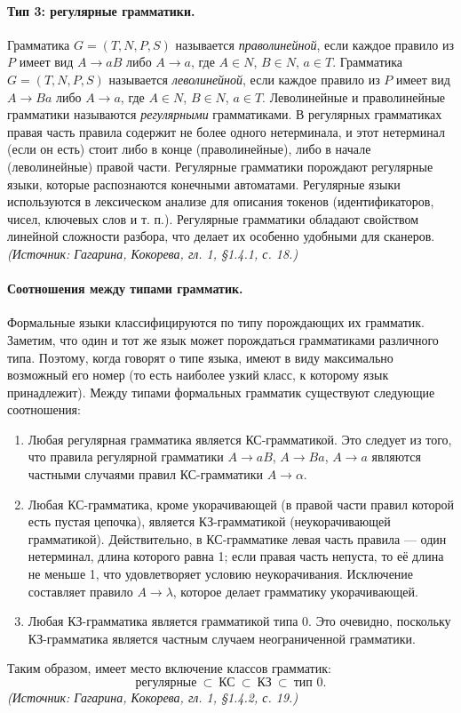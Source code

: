 \documentclass[a4paper,12pt]{article}
\begin{document}
\paragraph{Тип 3: регулярные грамматики.}
Грамматика \(G=(T,N,P,S)\) называется \emph{праволинейной}, если каждое правило из \(P\) имеет вид \(A\to aB\) либо \(A\to a\), где \(A\in N\), \(B\in N\), \(a\in T\). Грамматика \(G=(T,N,P,S)\) называется \emph{леволинейной}, если каждое правило из \(P\) имеет вид \(A\to Ba\) либо \(A\to a\), где \(A\in N\), \(B\in N\), \(a\in T\). Леволинейные и праволинейные грамматики называются \emph{регулярными} грамматиками. В регулярных грамматиках правая часть правила содержит не более одного нетерминала, и этот нетерминал (если он есть) стоит либо в конце (праволинейные), либо в начале (леволинейные) правой части. Регулярные грамматики порождают регулярные языки, которые распознаются конечными автоматами. Регулярные языки используются в лексическом анализе для описания токенов (идентификаторов, чисел, ключевых слов и т. п.). Регулярные грамматики обладают свойством линейной сложности разбора, что делает их особенно удобными для сканеров.
\textit{(Источник: Гагарина, Кокорева, гл. 1, §1.4.1, с. 18.)}

\paragraph{Соотношения между типами грамматик.}
Формальные языки классифицируются по типу порождающих их грамматик. Заметим, что один и тот же язык может порождаться грамматиками различного типа. Поэтому, когда говорят о типе языка, имеют в виду максимально возможный его номер (то есть наиболее узкий класс, к которому язык принадлежит). Между типами формальных грамматик существуют следующие соотношения:
\begin{enumerate}[label=\arabic*)]
\item Любая регулярная грамматика является КС-грамматикой. Это следует из того, что правила регулярной грамматики \(A\to aB\), \(A\to Ba\), \(A\to a\) являются частными случаями правил КС-грамматики \(A\to\alpha\).
\item Любая КС-грамматика, кроме укорачивающей (в правой части правил которой есть пустая цепочка), является КЗ-грамматикой (неукорачивающей грамматикой). Действительно, в КС-грамматике левая часть правила — один нетерминал, длина которого равна 1; если правая часть непуста, то её длина не меньше 1, что удовлетворяет условию неукорачивания. Исключение составляет правило \(A\to\lambda\), которое делает грамматику укорачивающей.
\item Любая КЗ-грамматика является грамматикой типа 0. Это очевидно, поскольку КЗ-грамматика является частным случаем неограниченной грамматики.
\end{enumerate}
Таким образом, имеет место включение классов грамматик:
\[
\text{регулярные}\ \subset\ \text{КС}\ \subset\ \text{КЗ}\ \subset\ \text{тип 0}.
\]
\textit{(Источник: Гагарина, Кокорева, гл. 1, §1.4.2, с. 19.)}
\end{document}
